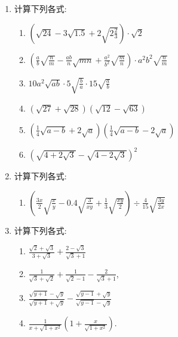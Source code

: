 \begin{enumerate}
\item 计算下列各式:
\begin{enumerate}
\item $\left(\sqrt{24}-3 \sqrt{1.5}+2 \sqrt{2 \frac{2}{3}}\right) \cdot \sqrt{2}$
\item $\left(\frac{a}{b} \sqrt{\frac{n}{m}}-\frac{a b}{n} \sqrt{m n}+\frac{a^{2}}{b^{2}} \sqrt{\frac{m}{n}}\right) \cdot a^{2} b^{2} \sqrt{\frac{n}{m}}$
\item $10 a^{2} \sqrt{a b} \cdot 5 \sqrt{\frac{b}{a}} \cdot 15 \sqrt{\frac{a}{b}}$
\item  $(\sqrt{27}+\sqrt{28})(\sqrt{12}-\sqrt{63})$
\item  $\left(\frac{1}{4} \sqrt{a-b}+2 \sqrt{a}\right)\left(\frac{1}{4} \sqrt{a-b}-2 \sqrt{a}\right)$
\item $\left(\sqrt{4+2 \sqrt{3}}-\sqrt{4-2 \sqrt{3}}\right)^{2}$
\end{enumerate}

\item 计算下列各式:
\begin{enumerate}
\item  $\left(\frac{3 x}{2} \sqrt{\frac{x}{y}}-0.4 \sqrt{\frac{3}{x y}}+\frac{1}{3} \sqrt{\frac{x y}{2}}\right) \div \frac{4}{15} \sqrt{\frac{3 y}{2 x}}$

\end{enumerate}

\item 计算下列各式:
\begin{multicols}{2}
    \begin{enumerate}
\item $\frac{\sqrt{2}+\sqrt{3}}{3+\sqrt{3}}+\frac{2-\sqrt{3}}{\sqrt{3}+1}$
\item $\frac{1}{\sqrt{3}+\sqrt{2}}+\frac{1}{\sqrt{2}-1}-\frac{2}{\sqrt{3}+1}$,
\item $\frac{\sqrt{y+1}-\sqrt{y}}{\sqrt{y+1}+\sqrt{y}}-\frac{\sqrt{y-1}+\sqrt{y}}{\sqrt{y-1}-\sqrt{y}}$
\item $\frac{1}{x+\sqrt{1+x^{2}}}\left(1+\frac{x}{\sqrt{1+x^{2}}}\right)$.
\end{enumerate}
\end{multicols}



\end{enumerate}
